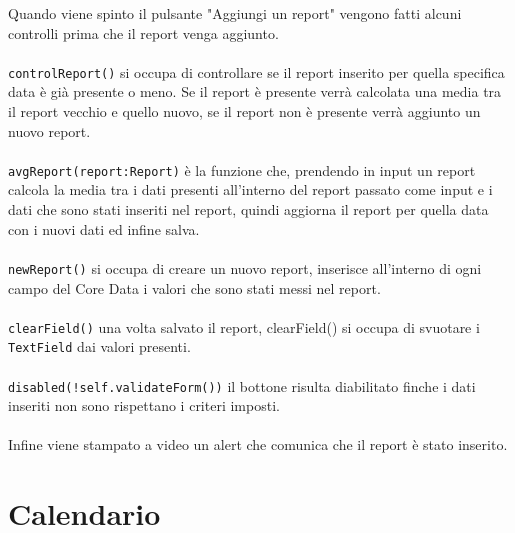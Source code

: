 \documentclass{article}
\begin{document}
Quando viene spinto il pulsante "Aggiungi un report" vengono fatti alcuni controlli prima che il report venga aggiunto. \\
\\
\texttt{controlReport()} si occupa di controllare se il report inserito per quella specifica data è già presente o meno. Se il report è presente verrà calcolata una media tra il report vecchio e quello nuovo, se il report non è presente verrà aggiunto un nuovo report.\\
\\
\texttt{avgReport(report:Report)} è la funzione che, prendendo in input un report calcola la media tra i dati presenti all'interno del report passato come input e i dati che sono stati inseriti nel report, quindi aggiorna il report per quella data con i nuovi dati ed infine salva.\\
\\
\texttt{newReport()} si occupa di creare un nuovo report, inserisce all'interno di ogni campo del Core Data i valori che sono stati messi nel report.\\
\\
\texttt{clearField()} una volta salvato il report, clearField() si occupa di svuotare i \texttt{TextField} dai valori presenti.\\
\\
\texttt{disabled(!self.validateForm())} il bottone risulta diabilitato finche i dati inseriti non sono rispettano i criteri imposti.\\
\\
Infine viene stampato a video un alert che comunica che il report è stato inserito.


\newpage
\section{Calendario}
\end{document}
